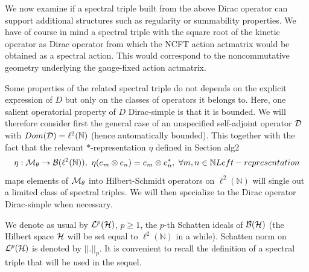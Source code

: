 \documentclass[10pt]{book}
\theoremstyle{break}
\begin{document}

We now examine if a spectral triple built from the above Dirac operator can support additional structures such as regularity or summability properties. We have of course in mind a spectral triple with the square root of the kinetic operator as Dirac operator from which the NCFT action {actmatrix} would be obtained as a spectral action. This would correspond to the noncommutative geometry underlying the gauge-fixed action {actmatrix}.\par 

Some properties of the related spectral triple do not depends on the explicit expression of $D$ but only on the classes of operators it belongs to. Here, one salient operatorial property of $D$ {Dirac-simple} is that it is bounded. We will therefore consider first the general case of an unspecified self-adjoint operator ${\cal{D}}$ with $Dom({\cal{D}})=\ell^2(\mathbb{N})$ (hence automatically bounded). This together with the fact that the relevant $*$-representation $\eta$ defined in Section {alg2} 
\begin{equation*}
\eta:{\cal{M}}_\theta\to{\cal{B}}(\ell^2(\mathbb{N})),\ \eta(e_m\otimes e_n)=e_m\otimes e^*_n,\ \forall m,n\in\mathbb{N}{Left-representation}
\end{equation*}
maps elements of ${\cal{M}}_\theta$ into Hilbert-Schmidt operators on $\ell^2(\mathbb{N})$ will single out a limited class of spectral triples. We will then specialize to the Dirac operator {Dirac-simple} when necessary.\par

We denote as usual by ${\cal{L}}^p({\cal{H}})$, $p\ge1$, the $p$-th Schatten ideals of ${\cal{B}}({\cal{H}})$ (the Hilbert space ${\cal{H}}$ will be set equal to $\ell^2(\mathbb{N})$ in a while). Schatten norm on ${\cal{L}}^p({\cal{H}})$ 
is denoted by $||.||_p$. It is convenient to recall the definition of a spectral triple that will be used in the sequel.
\end{document}
